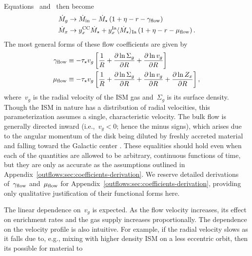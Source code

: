 Equations~
and~ then become
\begin{subequations}\begin{align}
\dot{M}_{g} &\rightarrow \dot{M}_\text{in} - \dot{M}_\star
\left(1 + \eta - r - \gamma_{\text{flow}}\right)
\\
\dot{M}_x &\rightarrow y_\text{$x$}^\text{CC} \dot{M}_\star +
y_\text{$x$}^\text{Ia} \langle \dot{M}_\star \rangle_\text{Ia}
\left(1 + \eta - r - \mu_{\text{flow}}\right).
\end{align}\end{subequations}
The most general forms of these flow coefficients are given by
\begin{subequations}\begin{align}
\gamma_{\text{flow}} &\equiv -\tau_\star v_g \left[
\frac{1}{R} +
\frac{\partial \ln \Sigma_g}{\partial R} +
\frac{\partial \ln v_g}{\partial R}
\right]
\label{outflows:eq:gamma-flow-general}
\\
\mu_{\text{flow}} &\equiv -\tau_\star v_g \left[
\frac{1}{R} + \frac{\partial \ln \Sigma_g}{\partial R} +
\frac{\partial \ln v_g}{\partial R} +
\frac{\partial \ln Z_x}{\partial R}
\right],
\label{outflows:eq:mu-flow-general}
\end{align}\end{subequations}
where~$v_g$ is the radial velocity of the ISM gas and~$\Sigma_g$ is its surface
density.
Though the ISM in nature has a distribution of radial velocities, this
parameterization assumes a single, characteristic velocity.
The bulk flow is generally directed inward (i.e.,~$v_g < 0$; hence the minus
signs), which arises due to the angular momentum of the disk being diluted by
freshly accreted material and falling toward the Galactic center
\citep[see discussion in, e.g.,][]{Bilitewski2012}.
These equalities should hold even when each of the quantities are allowed to be
arbitrary, continuous functions of time, but they are only as accurate as the
assumptions outlined in Appendix~\ref{outflows:sec:coefficients-derivation}.
We reserve detailed derivations of~$\gamma_{\text{flow}}$ and~$\mu_{\text{flow}}$ for
Appendix~\ref{outflows:sec:coefficients-derivation}, providing only
qualitative justification of their functional forms here.
\par
The linear dependence on~$v_g$ is expected.
As the flow velocity increases, its effect on enrichment rates and the gas
supply increases proportionally.
The dependence on the velocity profile is also intuitive.
For example, if the radial velocity slows as it falls due to, e.g., mixing with
higher density ISM on a less eccentric orbit, then its possible for material to
